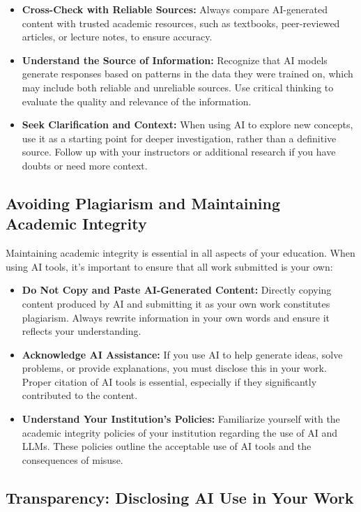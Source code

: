 \documentclass{article}
\begin{document}
\begin{itemize}
    \item \textbf{Cross-Check with Reliable Sources:} Always compare AI-generated content with trusted academic resources, such as textbooks, peer-reviewed articles, or lecture notes, to ensure accuracy.
    \item \textbf{Understand the Source of Information:} Recognize that AI models generate responses based on patterns in the data they were trained on, which may include both reliable and unreliable sources. Use critical thinking to evaluate the quality and relevance of the information.
    \item \textbf{Seek Clarification and Context:} When using AI to explore new concepts, use it as a starting point for deeper investigation, rather than a definitive source. Follow up with your instructors or additional research if you have doubts or need more context.
\end{itemize}

\subsection{Avoiding Plagiarism and Maintaining Academic Integrity}

Maintaining academic integrity is essential in all aspects of your education. When using AI tools, it's important to ensure that all work submitted is your own:

\begin{itemize}
    \item \textbf{Do Not Copy and Paste AI-Generated Content:} Directly copying content produced by AI and submitting it as your own work constitutes plagiarism. Always rewrite information in your own words and ensure it reflects your understanding.
    \item \textbf{Acknowledge AI Assistance:} If you use AI to help generate ideas, solve problems, or provide explanations, you must disclose this in your work. Proper citation of AI tools is essential, especially if they significantly contributed to the content.
    \item \textbf{Understand Your Institution’s Policies:} Familiarize yourself with the academic integrity policies of your institution regarding the use of AI and LLMs. These policies outline the acceptable use of AI tools and the consequences of misuse.
\end{itemize}

\subsection{Transparency: Disclosing AI Use in Your Work}
\end{document}
